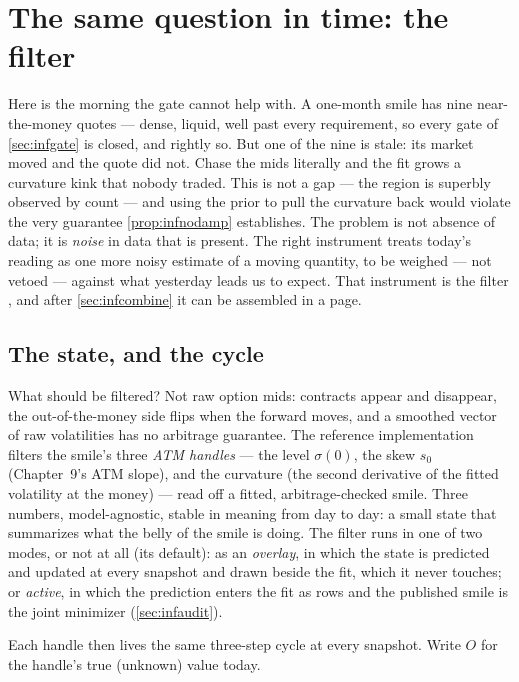 \section{The same question in time: the filter}
\label{sec:inffilter}

Here is the morning the gate cannot help with.  A one-month smile
has nine near-the-money quotes --- dense, liquid, well past every
requirement, so every gate of \cref{sec:infgate} is closed, and
rightly so.  But one of the nine is stale: its market moved and the
quote did not.  Chase the mids literally and the fit grows a
curvature kink that nobody traded.  This is not a gap --- the region
is superbly observed by count --- and using the prior to pull the
curvature back would violate the very guarantee
\cref{prop:infnodamp} establishes.  The problem is not absence of
data; it is \emph{noise} in data that is present.  The right
instrument treats today's reading as one more noisy estimate of a
moving quantity, to be weighed --- not vetoed --- against what
yesterday leads us to expect.  That instrument is the filter
\citep{Kalman1960,AndersonMoore1979}, and after
\cref{sec:infcombine} it can be assembled in a page.

\subsection{The state, and the cycle}

What should be filtered?  Not raw option mids: contracts appear and
disappear, the out-of-the-money side flips when the forward moves,
and a smoothed vector of raw volatilities has no arbitrage
guarantee.  The reference implementation filters the smile's three
\emph{ATM handles} --- the level $\sigma(0)$, the skew $s_0$
(Chapter~9's ATM slope), and the curvature (the second derivative of
the fitted volatility at the money) --- read off a fitted,
arbitrage-checked smile.  Three numbers, model-agnostic, stable in
meaning from day to day: a small state that summarizes what the
belly of the smile is doing.  The filter runs in one of two modes,
or not at all (its default): as an \emph{overlay}, in which the
state is predicted and updated at every snapshot and drawn beside
the fit, which it never touches; or \emph{active}, in which the
prediction enters the fit as rows and the published smile is the
joint minimizer (\cref{sec:infaudit}).

Each handle then lives the same three-step cycle at every snapshot.
Write $O$ for the handle's true (unknown) value today.

